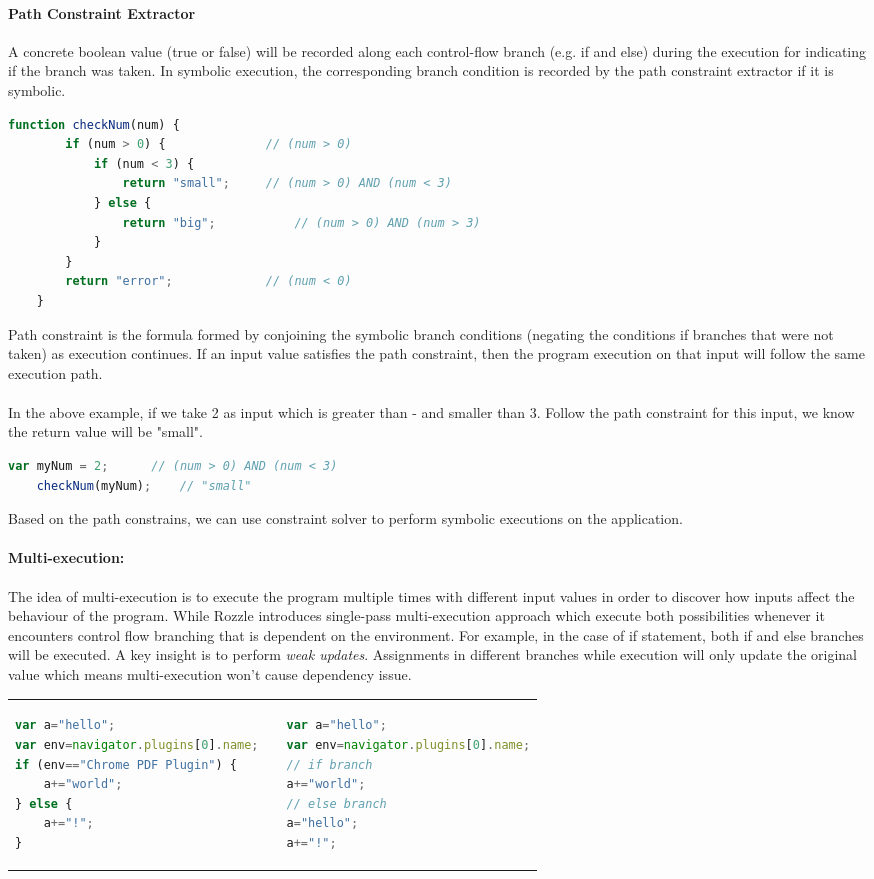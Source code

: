\documentclass[11pt]{article}
\begin{document}
\paragraph{Path Constraint Extractor}
A concrete boolean value (true or false) will be recorded along each control-flow branch (e.g. if and else) during the execution for indicating if the branch was taken. In symbolic execution, the corresponding branch condition is recorded by the path constraint extractor if it is symbolic. 
\begin{lstlisting}[language=JavaScript, title=(example path constrains) ]
	function checkNum(num) {
		if (num > 0) {				// (num > 0)
			if (num < 3) {
				return "small";		// (num > 0) AND (num < 3)
			} else {
				return "big";			// (num > 0) AND (num > 3)
			}
		}
		return "error";				// (num < 0)
	}
\end{lstlisting} 
Path constraint is the formula formed by conjoining the symbolic branch conditions (negating the conditions if branches that were not taken) as execution continues. If an input value satisfies the path constraint, then the program execution on that input will follow the same execution path.\\  \\ In the above example, if we take 2 as input which is greater than - and smaller than 3. Follow the path constraint for this input, we know the return value will be "small".
\begin{lstlisting}[language=JavaScript]
	var myNum = 2;		// (num > 0) AND (num < 3)
	checkNum(myNum);	// "small"
\end{lstlisting} 
Based on the path constrains, we can use constraint solver to perform symbolic executions on the application.
\paragraph{Multi-execution:}
The idea of multi-execution is to execute the program multiple times with different input values in order to discover how inputs affect the behaviour of the program. While Rozzle\cite{Rozzle} introduces single-pass multi-execution approach which execute both possibilities whenever it encounters control flow branching that is dependent on the environment. For example, in the case of if statement, both if and else branches will be executed. A key insight is to perform \textit{weak updates}. Assignments in different branches while execution will only update the original value which means multi-execution won't cause dependency issue. \\
\begin{tabular}{p{7.5cm}p{0.5cm}p{7.5cm}}
			\begin{lstlisting}[language=JavaScript, title=(original code)]
var a="hello";
var env=navigator.plugins[0].name;
if (env=="Chrome PDF Plugin") {
    a+="world"; 
} else {
    a+="!"; 
}
			\end{lstlisting} & & \begin{lstlisting}[language=JavaScript, title=(single-pass multi-execution) ]
var a="hello";
var env=navigator.plugins[0].name;
// if branch
a+="world"; 
// else branch
a="hello";
a+="!"; 
			\end{lstlisting} 
	\end{tabular}  
\newpage
\end{document}
